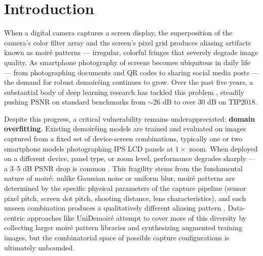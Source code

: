 \documentclass[review,10pt]{elsarticle}
\begin{document}
\section{Introduction}

When a digital camera captures a screen display, the superposition of the camera's color filter array and the screen's pixel grid produces aliasing artifacts known as moir\'{e} patterns --- irregular, colorful fringes that severely degrade image quality. As smartphone photography of screens becomes ubiquitous in daily life --- from photographing documents and QR codes to sharing social media posts --- the demand for robust demoir\'{e}ing continues to grow. Over the past five years, a substantial body of deep learning research has tackled this problem \cite{sun2018moire,zheng2022learning,he2020fhde2net,yu2022towards,guo2025moirenet}, steadily pushing PSNR on standard benchmarks from $\sim$26 dB to over 30 dB on TIP2018.

Despite this progress, a critical vulnerability remains underappreciated: \textbf{domain overfitting}. Existing demoir\'{e}ing models are trained and evaluated on images captured from a fixed set of device-screen combinations, typically one or two smartphone models photographing IPS LCD panels at $1\times$ zoom. When deployed on a different device, panel type, or zoom level, performance degrades sharply --- a 3--5 dB PSNR drop is common \cite{yang2025unidemoire}. This fragility stems from the fundamental nature of moir\'{e}: unlike Gaussian noise or uniform blur, moir\'{e} patterns are determined by the specific physical parameters of the capture pipeline (sensor pixel pitch, screen dot pitch, shooting distance, lens characteristics), and each unseen combination produces a qualitatively different aliasing pattern \cite{patel2016survey}. Data-centric approaches like UniDemoir\'{e} \cite{yang2025unidemoire} attempt to cover more of this diversity by collecting larger moir\'{e} pattern libraries and synthesizing augmented training images, but the combinatorial space of possible capture configurations is ultimately unbounded.
\end{document}
